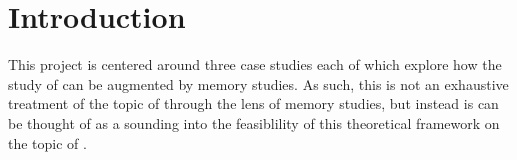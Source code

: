 
\chapter*{Introduction}



This project is centered around three case studies each of which explore how the study of \rwb can be augmented by memory studies. As such, this is not an exhaustive treatment of the topic of \rwb through the lens of memory studies, but instead is can be thought of as a sounding into the feasiblility of this theoretical framework on the topic of \rwb. 


